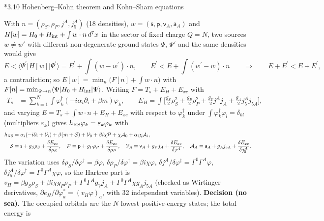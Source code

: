 \documentclass[10pt,a4paper]{article}
\makeatletter
\renewcommand\subsection{\@startsection{subsection}{2}{\z@}{-3.25ex\@plus -1ex \@minus -.2ex}{1.5ex \@plus .2ex}{\normalfont\large\bfseries\raggedright}}
\makeatother
\begin{document}
\subsection*{3.10 Hohenberg–Kohn theorem and Kohn–Sham equations}
With $n=(\rho_S,\rho_P,j^A,j_5^A)$ (18 densities), $w=(\mathsf s,\mathsf p,\mathsf v_A,\mathsf a_A)$ and $H[w]=H_0+H_{\rm int}+\int w\cdot n\,d^7x$ in the sector of fixed charge $Q=N$, two sources $w\neq w'$ with different non-degenerate ground states $\Psi$, $\Psi'$ and the same densities would give
\begin{equation*}
E<\langle\Psi^{\prime}|H[w]|\Psi^{\prime}\rangle=E^{\prime}+\int(w-w^{\prime})\cdot n,\qquad E^{\prime}<E+\int(w^{\prime}-w)\cdot n\qquad\Rightarrow\qquad E+E^{\prime}<E+E^{\prime},
\end{equation*}
a contradiction; so $E[w]=\min_n\big(F[n]+\int w\cdot n\big)$ with $F[n]=\min_{\Psi\to n}\langle\Psi|H_0+H_{\rm int}|\Psi\rangle$. Writing $F=T_s+E_H+E_{xc}$ with
\begin{align*}
T_s&=\sum_{k=1}^N\int\varphi_k^\dagger(-i\alpha_i\partial_i+\beta m)\varphi_k,\qquad E_H=\int\Big[\frac{g_S}2\rho_S^2+\frac{g_P}2\rho_P^2+\frac{g_V}2j^Aj_A+\frac{g_A}2j_5^Aj_{5A}\Big],
\end{align*}
and varying $E=T_s+\int w\cdot n+E_H+E_{xc}$ with respect to $\varphi_k^\dagger$ under $\int\varphi_k^\dagger\varphi_l=\delta_{kl}$ (multipliers $\varepsilon_k$) gives $h_{\rm KS}\varphi_k=\varepsilon_k\varphi_k$ with
\begin{align*}
h_{\rm KS}&=\alpha_i(-i\partial_i+\mathcal V_i)+\beta(m+\mathcal S)+\mathcal V_0+\beta i\chi\mathcal P+\chi\mathcal A_0+\alpha_i\chi\mathcal A_i, \\
\mathcal S&=\mathsf s+g_S\rho_S+\frac{\delta E_{xc}}{\delta\rho_S},\quad \mathcal P=\mathsf p+g_P\rho_P+\frac{\delta E_{xc}}{\delta\rho_P},\quad \mathcal V_A=\mathsf v_A+g_Vj_A+\frac{\delta E_{xc}}{\delta j^A},\quad \mathcal A_A=\mathsf a_A+g_Aj_{5A}+\frac{\delta E_{xc}}{\delta j_5^A}.
\end{align*}
The variation uses $\delta\rho_S/\delta\varphi^\dagger=\beta\varphi$, $\delta\rho_P/\delta\varphi^\dagger=\beta i\chi\varphi$, $\delta j^A/\delta\varphi^\dagger=\Gamma^0\Gamma^A\varphi$, $\delta j_5^A/\delta\varphi^\dagger=\Gamma^0\Gamma^A\chi\varphi$, so the Hartree part is $v_H=\beta g_S\rho_S+\beta i\chi g_P\rho_P+\Gamma^0\Gamma^Ag_Vj_A+\Gamma^0\Gamma^A\chi g_Aj_{5A}$ (checked as Wirtinger derivatives, $\partial e_H/\partial\varphi_a^*=(v_H\varphi)_a$, with 32 independent variables). \textbf{Decision (no sea).} The occupied orbitals are the $N$ lowest positive-energy states; the total energy is
\end{document}
